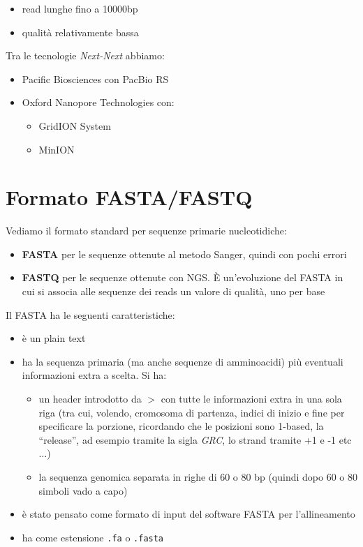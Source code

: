 \documentclass[a4paper,12pt, oneside]{book}
\begin{document}
\begin{itemize}
\begin{itemize}
    \item {\color{OliveGreen}read lunghe fino a 10000bp}
    \item {\color{OliveGreen}qualità relativamente bassa}
  \end{itemize}
  Tra le tecnologie \textit{Next-Next} abbiamo:
  \begin{itemize}
    \item Pacific Biosciences con PacBio RS
    \item Oxford Nanopore Technologies con:
    \begin{itemize}
      \item GridION System 
      \item MinION
    \end{itemize}
  \end{itemize}
\end{itemize}
\section{Formato FASTA/FASTQ}
Vediamo il formato standard per sequenze primarie nucleotidiche:
\begin{itemize}
  \item \textbf{FASTA} per le sequenze ottenute al metodo Sanger, quindi con
  pochi errori 
  \item \textbf{FASTQ} per le sequenze ottenute con NGS. È un'evoluzione del
  FASTA in cui si associa alle sequenze dei reads un valore di qualità, uno per
  base 
\end{itemize}
Il FASTA ha le seguenti caratteristiche:
\begin{itemize}
  \item è un plain text
  \item ha la sequenza primaria (ma anche sequenze di amminoacidi) più
  eventuali informazioni extra a scelta. Si ha:
  \begin{itemize}
    \item un header introdotto da $>$ con tutte le informazioni extra in una
    sola riga (tra cui, volendo, cromosoma di partenza, indici di inizio e fine
    per specificare la porzione, ricordando che le posizioni sono 1-based, la
    ``release'', ad esempio tramite la sigla \textit{GRC}, lo strand tramite +1
    e -1 etc$\ldots$)  
    \item la sequenza genomica separata in righe di 60 o 80 bp (quindi dopo 60 o
    80 simboli vado a capo)
  \end{itemize}
  \item è stato pensato come formato di input del software FASTA per
  l'allineamento
  \item ha come estensione \texttt{.fa} o \texttt{.fasta}
\end{itemize}
\end{document}
